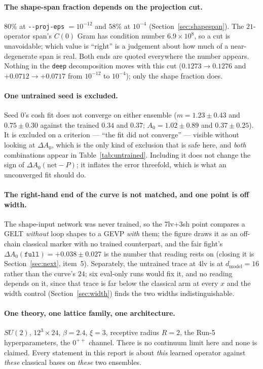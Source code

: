 \documentclass[11pt,a4paper]{article}
\newcommand{\Azero}{A_0}
\newcommand{\dAzero}{\Delta A_0}
\newcommand{\arm}[1]{\texttt{#1}}
\begin{document}
\paragraph{The shape-span fraction depends on the projection cut.} $80\%$ at
\texttt{-{}-proj-eps} $=10^{-12}$ and $58\%$ at $10^{-4}$
(Section~\ref{sec:shapespan}). The $21$-operator span's $C(0)$ Gram has
condition number $6.9\times10^{8}$, so a cut is unavoidable; which value is
``right'' is a judgement about how much of a near-degenerate span is real. Both
ends are quoted everywhere the number appears. Nothing in the \arm{deep}
decomposition moves with this cut ($0.1273 \to 0.1276$ and $+0.0712 \to +0.0717$
from $10^{-12}$ to $10^{-4}$); only the shape fraction does.

\paragraph{One untrained seed is excluded.} Seed $0$'s cosh fit does not
converge on either ensemble ($m = 1.23 \pm 0.43$ and $0.75 \pm 0.30$ against the
trained $0.34$ and $0.37$; $\Azero = 1.02 \pm 0.89$ and $0.37 \pm 0.25$). It is
excluded on a criterion --- ``the fit did not converge'' --- visible without
looking at $\dAzero$, which is the only kind of exclusion that is safe here, and
\emph{both} combinations appear in Table~\ref{tab:untrained}. Including it does
not change the sign of $\dAzero(\text{net}-P)$; it inflates the error threefold,
which is what an unconverged fit should do.

\paragraph{The right-hand end of the curve is not matched, and one point is off
width.} The shape-input network was never trained, so the 7lv+3sh point compares
a GELT \emph{without} loop shapes to a GEVP \emph{with} them; the figure draws
it as an off-chain classical marker with no trained counterpart, and the fair
fight's $\dAzero(\arm{full}) = +0.038 \pm 0.027$ is the number that reading
rests on (closing it is Section~\ref{sec:next}, item~5). Separately, the
untrained trace at 4lv is at $d_{\text{model}} = 16$ rather than the curve's
$24$; six eval-only runs would fix it, and no reading depends on it, since that
trace is far below the classical arm at every $x$ and the width control
(Section~\ref{sec:width}) finds the two widths indistinguishable.

\paragraph{One theory, one lattice family, one architecture.} $SU(2)$,
$12^3\times24$, $\beta = 2.4$, $\xi = 3$, receptive radius $R = 2$, the Run-5
hyperparameters, the $0^{++}$ channel. There is no continuum limit here and none
is claimed. Every statement in this report is about \emph{this} learned operator
against \emph{these} classical bases on \emph{these} two ensembles.
\end{document}
